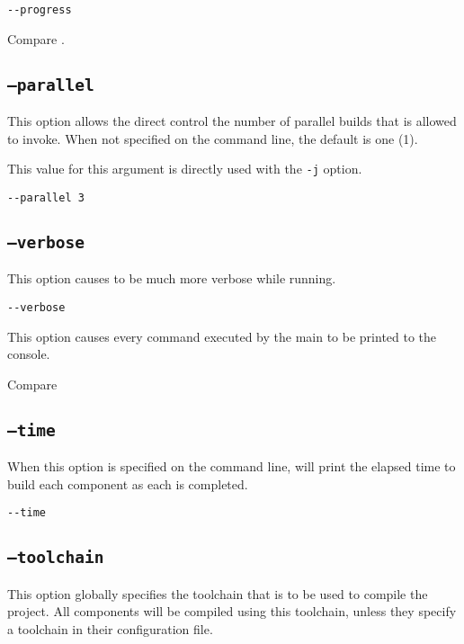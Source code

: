\begin{verbatim}
--progress
\end{verbatim}

Compare .

\subsection{\texttt{--parallel}}

This option allows the direct control the number of parallel builds
that \make is allowed to invoke.  When not specified on the command
line, the default is one (1).

This value for this argument is directly used with the \gnumake
\texttt{-j} option.

\begin{verbatim}
--parallel 3
\end{verbatim}

\subsection{\texttt{--verbose}}\label{usinglmsbw:verbose}

This option causes \lmsbw to be much more verbose while running.

\begin{verbatim}
--verbose
\end{verbatim}

This option causes every command executed by the main \makefile to be
printed to the console.

Compare 

\subsection{\texttt{--time}}

When this option is specified on the command line, \lmsbw will print
the elapsed time to build each component as each is completed.

\begin{verbatim}
--time
\end{verbatim}

\subsection{\texttt{--toolchain}}\label{usinglmsbw:toolchain}

This option globally specifies the toolchain that is to be used to
compile the project.  All components will be compiled using this
toolchain, unless they specify a toolchain in their configuration
file.

